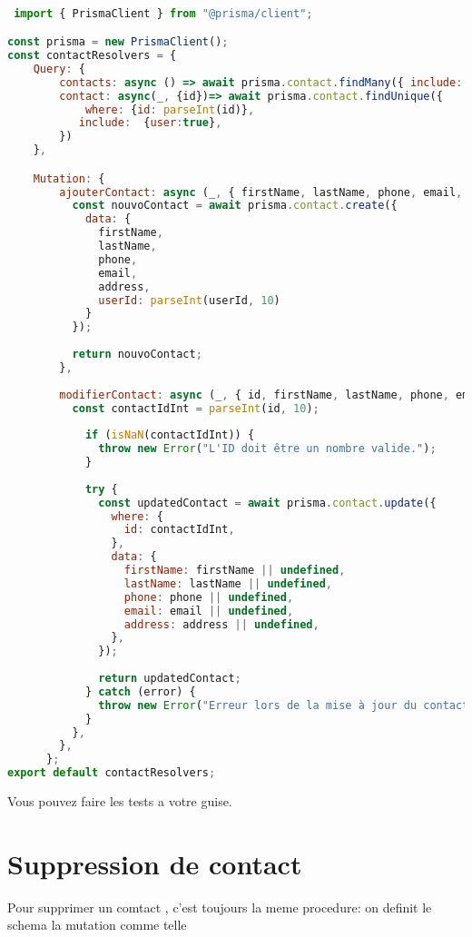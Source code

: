 \documentclass{article}
\begin{document}
\begin{lstlisting}[language=JavaScript]

 import { PrismaClient } from "@prisma/client";

const prisma = new PrismaClient();
const contactResolvers = {
    Query: {
        contacts: async () => await prisma.contact.findMany({ include: { user: true } }),
        contact: async(_, {id})=> await prisma.contact.findUnique({
            where: {id: parseInt(id)},
           include:  {user:true},
        })
    },

    Mutation: {
        ajouterContact: async (_, { firstName, lastName, phone, email, address, userId }) => {
          const nouvoContact = await prisma.contact.create({
            data: {
              firstName,
              lastName,
              phone,
              email,
              address,
              userId: parseInt(userId, 10)
            }
          });
    
          return nouvoContact; 
        },
      
        modifierContact: async (_, { id, firstName, lastName, phone, email, address }) => {
          const contactIdInt = parseInt(id, 10);
      
            if (isNaN(contactIdInt)) {
              throw new Error("L'ID doit être un nombre valide.");
            }
      
            try {
              const updatedContact = await prisma.contact.update({
                where: {
                  id: contactIdInt, 
                },
                data: {
                  firstName: firstName || undefined,
                  lastName: lastName || undefined,
                  phone: phone || undefined,
                  email: email || undefined,
                  address: address || undefined,
                },
              });
      
              return updatedContact;
            } catch (error) {
              throw new Error("Erreur lors de la mise à jour du contact : " + error.message);
            }
          },
        },
      };
export default contactResolvers;
\end{lstlisting}
Vous pouvez faire les tests a votre guise.
\section*{Suppression de contact}
Pour supprimer un comtact , c'est toujours la meme procedure: on definit le schema la mutation comme telle 
\end{document}
